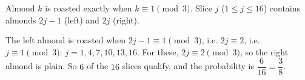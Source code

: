 Almond $k$ is roasted exactly when $k\equiv1\pmod3$. Slice $j$ ($1\le j\le16$) contains almonds $2j-1$ (left) and $2j$ (right).

The left almond is roasted when $2j-1\equiv1\pmod3$, i.e. $2j\equiv2$, i.e. $j\equiv1\pmod3$: $j=1,4,7,10,13,16$. For these, $2j\equiv2\pmod3$, so the right almond is plain. So $6$ of the $16$ slices qualify, and the probability is $\dfrac{6}{16}=\boxed{\dfrac38}$.
